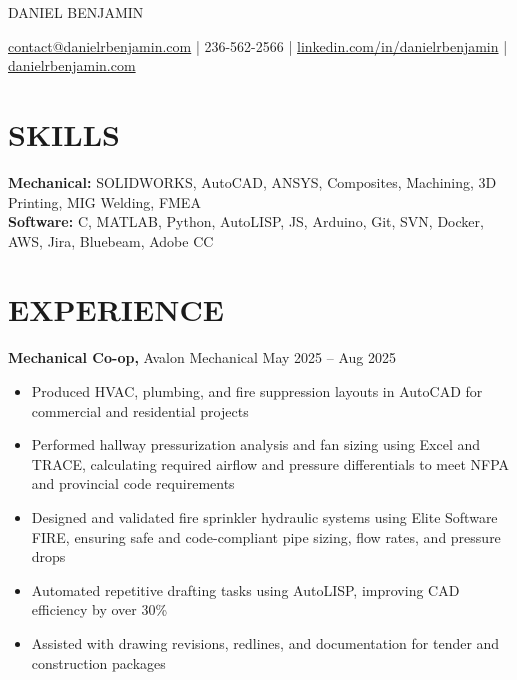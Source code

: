\documentclass[11pt]{article}       %
\begin{document}
\centerline{\Huge \color{accentColour} DANIEL BENJAMIN}

\vspace{5pt}

\centerline{\href{mailto:contact@danielrbenjamin.com}{contact@danielrbenjamin.com} | 236-562-2566 | \href{https://www.linkedin.com/in/danielrbenjamin}{linkedin.com/in/danielrbenjamin} | \href{https://www.danielrbenjamin.com/}{danielrbenjamin.com}}

\vspace{-6.5pt}

\section*{SKILLS}
\textbf{Mechanical:} SOLIDWORKS, AutoCAD, ANSYS, Composites, Machining, 3D Printing, MIG Welding, FMEA\\
\textbf{Software:} C, MATLAB, Python, AutoLISP, JS, Arduino, Git, SVN, Docker, AWS, Jira, Bluebeam, Adobe CC

\vspace{-6.5pt}

\section*{EXPERIENCE}

\textbf{Mechanical Co-op,} {Avalon Mechanical} \hfill May 2025 -- Aug 2025 \\
\vspace{-8.5pt}
\begin{itemize}
  \item Produced HVAC, plumbing, and fire suppression layouts in AutoCAD for commercial and residential projects
  \item Performed hallway pressurization analysis and fan sizing using Excel and TRACE, calculating required airflow and pressure differentials to meet NFPA and provincial code requirements
  \item Designed and validated fire sprinkler hydraulic systems using Elite Software FIRE, ensuring safe and code-compliant pipe sizing, flow rates, and pressure drops
  \item Automated repetitive drafting tasks using AutoLISP, improving CAD efficiency by over 30\%
  \item Assisted with drawing revisions, redlines, and documentation for tender and construction packages
\end{itemize}
\end{document}
